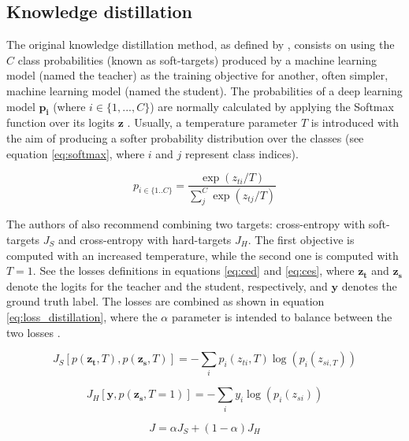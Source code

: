 \subsection{Knowledge distillation} \label{sec:distillation_kd}
The original knowledge distillation method, as defined by \cite{hinton2015}, consists on using the $C$ class probabilities (known as soft-targets) produced by a machine learning model (named the teacher) as the training objective for another, often simpler, machine learning model (named the student). The probabilities of a deep learning model $\mathbf{p_i}$ (where $i \in \{1,...,C\}$) are normally calculated by applying the Softmax function over its logits $\mathbf{z}$ \cite{Goodfellow2016}. Usually, a temperature parameter $T$ is introduced with the aim of producing a softer probability distribution over the classes (see equation \ref{eq:softmax}, where $i$ and $j$ represent class indices).

\begin{equation}
p_{i \in \{1 .. C\}} = \frac{\exp(z_{ti}/T)}{\sum_j^C \exp(z_{tj}/T)}
\label{eq:softmax}
\end{equation}

The authors of \cite{hinton2015} also recommend combining two targets: cross-entropy with soft-targets $J_S$ and cross-entropy with hard-targets  $J_H$. The first objective is computed with an increased temperature, while the second one is computed with $T=1$. See the losses definitions in equations \ref{eq:ced} and \ref{eq:ces}, where $\mathbf{z_t}$ and $\mathbf{z_s}$ denote the logits for the teacher and the student, respectively, and $\mathbf{y}$ denotes the ground truth label. The losses are combined as shown in equation \ref{eq:loss_distillation}, where the $\alpha$ parameter is intended to balance between the two losses \cite{gou2020}.

\begin{equation}
J_S\left[p( \mathbf{z_t}, T), p(\mathbf{z_s}, T) \right] = -\sum_i p_i(z_{ti}, T) \log \left(p_i(z_{si, T})\right)
\label{eq:ced}
\end{equation}

\begin{equation}
J_{H}\left[\mathbf{y}, p(\mathbf{z_s}, T=1) \right] = -\sum_i y_i \log \left(p_i(z_{si})\right)
\label{eq:ces}
\end{equation}

\begin{equation}
J = \alpha J_S + (1-\alpha) J_{H}
\label{eq:loss_distillation}
\end{equation}

